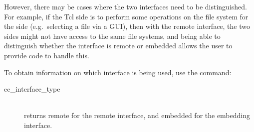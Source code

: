 However, there may be cases where the two interfaces need to be
distinguished. For example, if the Tcl side is to perform some operations
on the file system for the {\eclipse} side (e.g.\ selecting a file via a
GUI), then with the remote interface, the two sides might not have access
to the same file systems, and being able to distinguish whether the
interface is remote or embedded allows the user to provide code to handle
this.  

To obtain information on which interface is being used, use the command:

\begin{description}
\item[ec_interface_type]\ \\
	returns remote for the remote interface, and embedded for the
        embedding interface.
\end{description}




